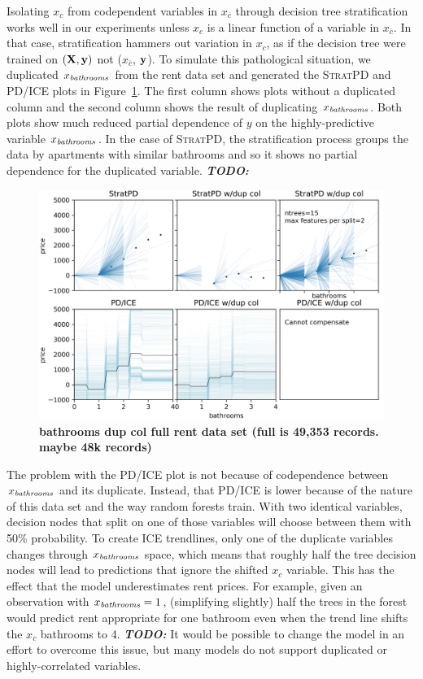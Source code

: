 \documentclass[12pt]{article}
\newcommand{\figref}[1]{Figure~\ref{#1}}
\newcommand{\todo}[1]{{\bf\em TODO:} {{\color{red}{#1}}}}
\newcommand{\spd}{\fontfamily{cmr}\textsc{\small StratPD}}
\newcommand{\xnc}{$x_{\overline{c}}$}
\begin{document}
Isolating $x_c$ from codependent variables in \xnc{} through decision tree stratification works well in our experiments unless $x_c$ is a linear function of a variable in \xnc{}. In that case, stratification hammers out variation in $x_c$, as if the decision tree were trained on $(\bf X, y)$ not (\xnc, $\bf y$). To simulate this pathological situation, we duplicated $x_{\it bathrooms}$ from the rent data set and generated the \spd{} and PD/ICE plots in \figref{fig:baths_dup}. The first column shows plots without a duplicated column and the second column shows the result of duplicating $x_{\it bathrooms}$. Both plots show much reduced partial dependence of $y$ on the highly-predictive variable $x_{\it bathrooms}$. In the case of \spd{}, the stratification process groups the data by apartments with similar bathrooms and so it shows no partial dependence for the duplicated variable.  \todo{why are there many fewer lines in stratpd plot would do begin to column?}

\begin{figure}[htbp]
\begin{center}
\includegraphics[scale=0.6]{images/bathrooms_vs_price_dup.png}
\caption{{\bf  bathrooms dup col full rent data set (full is 49,353 records. maybe 48k records)}}
\label{fig:baths_dup}
\end{center}
\end{figure}

The problem with the PD/ICE plot is not because of codependence between $x_{\it bathrooms}$ and its duplicate. Instead, that PD/ICE is lower because of the nature of this data set and the way random forests train. With two identical variables, decision nodes that split on one of those variables will choose between them with 50\% probability.  To create ICE trendlines, only one of the duplicate variables changes through $x_{\it bathrooms}$ space, which means that roughly half the tree decision nodes will lead to predictions that ignore the shifted $x_c$ variable.  This has the effect that the model underestimates rent prices.  For example, given an observation with $x_{\it bathrooms}=1$, (simplifying slightly) half the trees in the forest would predict rent appropriate for one bathroom even when the trend line shifts the $x_c$ bathrooms to 4. \todo{James: is this clear enough?}  It would be possible to change the model in an effort to overcome this issue, but many models do not support duplicated or highly-correlated variables.
\end{document}
